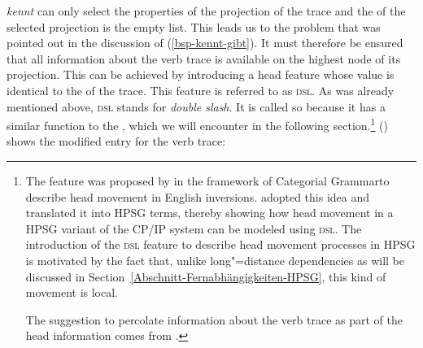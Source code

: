 \emph{kennt} can only select the properties of the projection of the trace and the \subcatl of the
selected projection is the empty list. This leads us to the problem that was pointed out in the
discussion of (\ref{bsp-kennt-gibt}). It must therefore be ensured that all information about the verb trace is available
on the highest node of its projection. This can be achieved by introducing a head feature whose
value is identical to the \localv of the trace. This feature is referred to as
\textsc{dsl}. As was already mentioned above, \textsc{dsl} stands for \emph{double
  slash}. It is called so because it has a similar function to the \slashf, which we will encounter in the following section.\footnote{
	The feature \dsl was proposed by \citet*{Jacobson87} in the framework of Categorial Grammar\indexcg to describe head movement in English
	inversions. \citet{Borsley89} adopted this idea and translated it into HPSG terms, thereby showing how head movement
	in a HPSG variant of the CP/IP system can be modeled using \textsc{dsl}.
	The introduction of the \textsc{dsl} feature to describe head movement processes in HPSG is
        motivated by the fact that, unlike long"=distance dependencies as will be discussed in Section~\ref{Abschnitt-Fernabhängigkeiten-HPSG}, this kind of movement is local.
	
	The suggestion to percolate information about the verb trace as part of the head information comes from \citet{Oliva92a}.%
}
() shows the modified entry for the verb trace:

